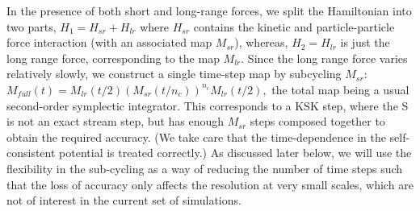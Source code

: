 In the presence of both short and long-range forces, we split the
Hamiltonian into two parts, $H_1=H_{sr} + H_{lr}$ where $H_{sr}$
contains the kinetic and particle-particle force interaction (with an
associated map $M_{sr}$), whereas, $H_2=H_{lr}$ is just the long range
force, corresponding to the map $M_{lr}$. Since the long range force
varies relatively slowly, we construct a single time-step map by
subcycling $M_{sr}$:
$M_{full}(t)=M_{lr}(t/2)(M_{sr}(t/n_c))^{n_c}M_{lr}(t/2),$ the total
map being a usual second-order symplectic integrator. This corresponds
to a KSK step, where the S is not an exact stream step, but has enough
$M_{sr}$ steps composed together to obtain the required accuracy. (We
take care that the time-dependence in the self-consistent potential is
treated correctly.)  As discussed later below, we will use the
flexibility in the sub-cycling as a way of reducing the number of time
steps such that the loss of accuracy only affects the resolution at
very small scales, which are not of interest in the current set of
simulations.
